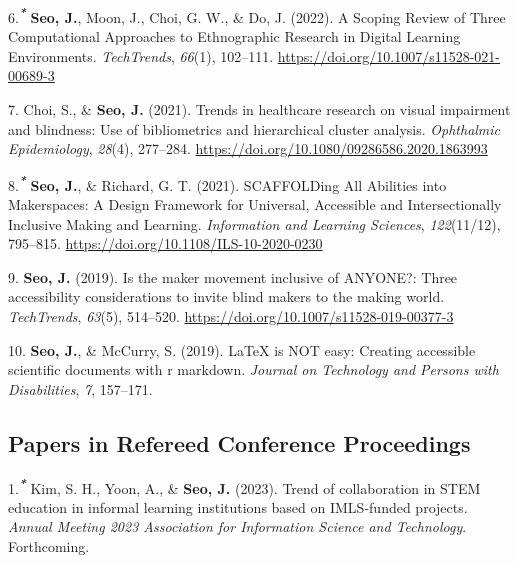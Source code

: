 \documentclass[11pt,a4paper,]{awesome-cv}
\begin{document}
\leavevmode{}%
6.\textsuperscript{\textbf{\emph{*}}} \textbf{Seo, J.}, Moon, J., Choi,
G. W., \& Do, J. (2022). A Scoping Review of Three Computational
Approaches to Ethnographic Research in Digital Learning Environments.
\emph{TechTrends}, \emph{66}(1), 102--111.
\url{https://doi.org/10.1007/s11528-021-00689-3}

\leavevmode{}%
7. Choi, S., \& \textbf{Seo, J.} (2021). Trends in healthcare research
on visual impairment and blindness: Use of bibliometrics and
hierarchical cluster analysis. \emph{Ophthalmic Epidemiology},
\emph{28}(4), 277--284.
\url{https://doi.org/10.1080/09286586.2020.1863993}

\leavevmode{}%
8.\textsuperscript{\textbf{\emph{*}}} \textbf{Seo, J.}, \& Richard, G.
T. (2021). SCAFFOLDing All Abilities into Makerspaces: A Design
Framework for Universal, Accessible and Intersectionally Inclusive
Making and Learning. \emph{Information and Learning Sciences},
\emph{122}(11/12), 795--815.
\url{https://doi.org/10.1108/ILS-10-2020-0230}

\leavevmode{}%
9. \textbf{Seo, J.} (2019). Is the maker movement inclusive of ANYONE?:
Three accessibility considerations to invite blind makers to the making
world. \emph{TechTrends}, \emph{63}(5), 514--520.
\url{https://doi.org/10.1007/s11528-019-00377-3}

\leavevmode{}%
10. \textbf{Seo, J.}, \& McCurry, S. (2019). LaTeX is NOT easy: Creating
accessible scientific documents with r markdown. \emph{Journal on
Technology and Persons with Disabilities}, \emph{7}, 157--171.

\hypertarget{papers-in-refereed-conference-proceedings}{%
\subsection{Papers in Refereed Conference
Proceedings}\label{papers-in-refereed-conference-proceedings}}

\hypertarget{bibliography}{}
\leavevmode{}%
1.\textsuperscript{\textbf{\emph{*}}} Kim, S. H., Yoon, A., \&
\textbf{Seo, J.} (2023). Trend of collaboration in STEM education in
informal learning institutions based on IMLS-funded projects.
\emph{Annual Meeting 2023 Association for Information Science and
Technology}. Forthcoming.
\end{document}
